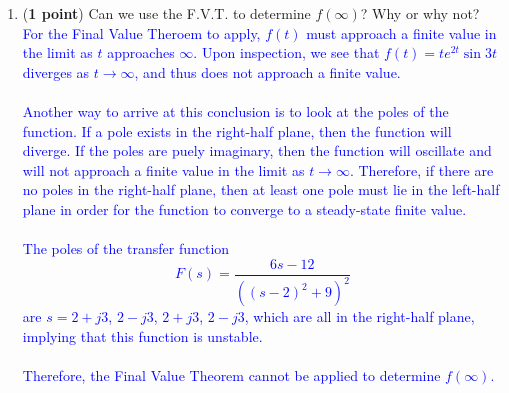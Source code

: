 \documentclass[]{article}
\begin{document}
\begin{enumerate}
\begin{enumerate}
        \item (\textbf{1 point}) Can we use the F.V.T. to determine $f(\infty)$? Why or why not?\\
        \textcolor{blue}{
        For the Final Value Theroem to apply, $f(t)$ must approach a finite value in the limit as $t$ approaches $\infty$. Upon inspection, we see that $f(t)=te^{2t}\sin{3t}$ diverges as $t \rightarrow \infty$, and thus does not approach a finite value.\\\\
        Another way to arrive at this conclusion is to look at the poles of the function. If a pole exists in the right-half plane, then the function will diverge. If the poles are puely imaginary, then the function will oscillate and will not approach a finite value in the limit as $t \rightarrow \infty$. Therefore, if there are no poles in the right-half plane, then at least one pole must lie in the left-half plane in order for the function to converge to a steady-state finite value.\\\\
        The poles of the transfer function $$F(s)=\frac{6s-12}{((s-2)^2+9)^2}$$ are $s=2+j3$, $2-j3$, $2+j3$, $2-j3$, which are all in the right-half plane, implying that this function is unstable.\\\\
        Therefore, the Final Value Theorem cannot be applied to determine $f(\infty)$.
        }
    \end{enumerate}
    \vspace{0.4 cm}



\end{enumerate}
\end{document}
